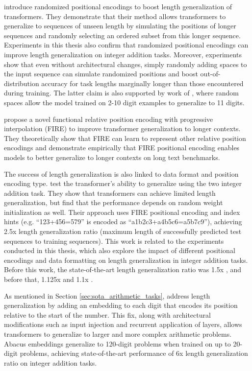 \cite{ruoss_randomized_2023} introduce randomized positional encodings to boost length generalization of transformers. They demonstrate that their method allows transformers to generalize to sequences of unseen length by simulating the positions of longer sequences and randomly selecting an ordered subset from this longer sequence. Experiments in this thesis also confirm that randomized positional encodings can improve length generalization on integer addition tasks. Moreover, experiments show that even without architectural changes, simply randomly adding spaces to the input sequence can simulate randomized positions and boost out-of-distribution accuracy for task lengths marginally longer than those encountered during training. The latter claim is also supported by work of \cite{shen_positional_2023}, where random spaces allow the model trained on 2-10 digit examples to generalize to 11 digits.

\cite{li_functional_2024} propose a novel functional relative position encoding with progressive interpolation (FIRE) to improve transformer generalization to longer contexts. They theoretically show that FIRE can learn to represent other relative position encodings and demonstrate empirically that FIRE positional encoding enables models to better generalize to longer contexts on long text benchmarks.

The success of length generalization is also linked to data format and position encoding type. \cite{zhou_transformers_2024} test the transformer's ability to generalize using the two integer addition task. They show that transformers can achieve limited length generalization, but find that the performance depends on random weight initialization as well. Their approach uses FIRE positional encoding and index hints (e.g. ``123+456=579'' is encoded as ``a1b2c3+a4b5c6=a5b7c9''), achieving 2.5x length generalization ratio (maximum length of successfully predicted test sequences to training sequences). This work is related to the experiments conducted in this thesis, which also explore the impact of different positional encodings and data formatting on length generalization in integer addition tasks. Before this work, the state-of-the-art length generalization ratio was 1.5x \parencite{zhou_what_2023}, and before that, 1.125x \parencite{kazemnejad_impact_2023} and 1.1x \parencite{shen_positional_2023}.

As mentioned in Section \ref{sec:sota_arithmetic_tasks}, \cite{mcleish_transformers_2024} address length generalization by adding an embedding to each digit that encodes its position relative to the start of the number. This fix, along with architectural modifications such as input injection and recurrent application of layers, allows transformers to generalize to larger and more complex arithmetic problems. Abacus embeddings generalize to 120-digit problems when trained on up to 20-digit problems, achieving state-of-the-art performance of 6x length generalization ratio on integer addition tasks.

